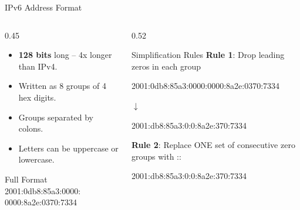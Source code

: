 \documentclass[aspectratio=169]{beamer}  %
\begin{document}
\begin{frame}{IPv6 Address Format}
    \begin{columns}[T]
        \begin{column}{0.45\textwidth}
            \begin{itemize}
                \item \textbf{128 bits} long -- 4x longer than IPv4.
                \item Written as 8 groups of 4 hex digits.
                \item Groups separated by colons.
                \item Letters can be uppercase or lowercase.
            \end{itemize}
            
            \vspace{0.3em}
            \begin{block}{Full Format}
                \ttfamily\small
                2001:0db8:85a3:0000:\\0000:8a2e:0370:7334
            \end{block}
        \end{column}
        \begin{column}{0.52\textwidth}
            \begin{block}{Simplification Rules}
                \small
                \textbf{Rule 1}: Drop leading zeros in each group
                
                \vspace{0.2em}
                \ttfamily\footnotesize
                2001:\textcolor{alertred}{0}db8:85a3:\textcolor{alertred}{000}0:\textcolor{alertred}{000}0:8a2e:\textcolor{alertred}{0}370:7334
                
                \vspace{0.1em}
                $\downarrow$
                
                \vspace{0.1em}
                2001:db8:85a3:0:0:8a2e:370:7334
                
                \vspace{0.4em}
                \normalfont
                \textbf{Rule 2}: Replace ONE set of consecutive zero groups with ::
                
                \vspace{0.2em}
                \ttfamily\footnotesize
                2001:db8:85a3:\textcolor{alertred}{0:0}:8a2e:370:7334
                

\end{block}
\end{column}
\end{columns}
\end{frame}
\end{document}
